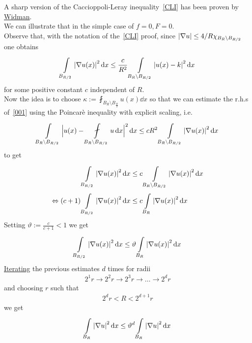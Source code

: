 A sharp version of the Caccioppoli-Leray inequality~\eqref{CLI} has been proven by \underline{Widman}.\\
We can illustrate that in the simple case of \(f=0, F=0\).\\
Observe that, with the notation of the~\eqref{CLI} proof, since \(\abs{\nabla u}\leq \frac{4}{R} \chi_{B_{R}\setminus B_{\frac{R}{2}}}\) one obtains
\begin{gather}
	\int\limits_{B_{\frac{R}{2}}}^{} \abs{\nabla u(x)}^{2} \dd{x} \leq \frac{c}{R^{2}} \int\limits_{B_{R} \setminus B_{\frac{R}{2}}}^{} \abs{u(x)-k}^{2} \dd{x} \label{001}
\end{gather}
for some positive constant \(c\) independent of \(R\).\\
Now the idea is to choose \(\kappa := \fint_{B_{R}\setminus B_{\frac{R}{2}}} u(x) \dd{x}\) so that we can estimate the r.h.s of~\eqref{001} using the Poincarè inequality with explicit scaling, i.e.
\begin{gather}
	\int\limits_{B_{R}\setminus B_{\frac{R}{2}}}^{} \Big\lvert u(x)-\fint\limits_{B_{R}\setminus B_{\frac{R}{2}}}^{} u \dd{x} \Big\rvert^{2} \dd{x} \leq cR^{2}\int\limits_{B_{R}\setminus B_{\frac{R}{2}}}^{} \abs{\nabla u(x)}^{2} \dd{x}
\end{gather}
to get
\begin{align}
	                       & \int\limits_{B_{\frac{R}{2}}}^{} \abs{\nabla u(x)}^{2} \dd{x} \leq c \int\limits_{B_{R}\setminus B_{\frac{R}{2}}}^{} \abs{\nabla u(x)}^{2} \dd{x} \\
	\Leftrightarrow  (c+1) & \int\limits_{B_{\frac{R}{2}}}^{} \abs{\nabla u(x)}^{2} \dd{x} \leq c \int\limits_{B_{R}}^{} \abs{\nabla u(x)}^{2} \dd{x}
\end{align}
Setting \( \vartheta := \frac{c}{c+1}<1\) we get
\begin{gather}
	\int\limits_{B_{\frac{R}{2}}}^{} \abs{\nabla u(x)}^{2} \dd{x} \leq \vartheta \int\limits_{B_{R}}^{} \abs{\nabla u(x)}^{2} \dd{x}
\end{gather}
\underline{Iterating} the previous estimates \(d\) times for radii
\begin{gather}
	2^{1}r \to 2^{2}r \to 2^{3}r \to \dots \to 2^{d}r
\end{gather}
and choosing \(r\) such that
\begin{gather}
	2^{d}r < R< 2^{d+1}r \label{002}
\end{gather}
we get
\begin{gather}
	\int\limits_{B_{R}}^{} \left\lvert\nabla u\right\rvert^{2} \mathop{}\!\mathrm{d}x \leq \vartheta^{d}\int\limits_{B_{R}}^{} \left\lvert\nabla u\right\rvert^{2} \mathop{}\!\mathrm{d}x
\end{gather}
